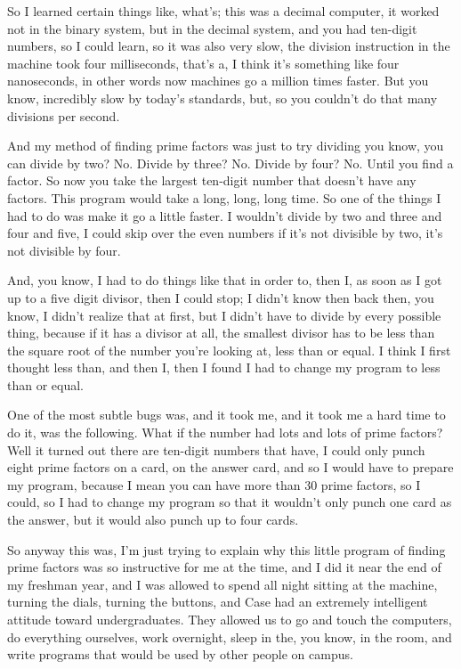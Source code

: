 \documentclass[]{article}
\begin{document}
So I learned certain things like, what's; this was a decimal computer,
it worked not in the binary system, but in the decimal system, and you
had ten-digit numbers, so I could learn, so it was also very slow, the
division instruction in the machine took four milliseconds, that's a, I
think it's something like four nanoseconds, in other words now machines
go a million times faster. But you know, incredibly slow by today's
standards, but, so you couldn't do that many divisions per second.

And my method of finding prime factors was just to try dividing you
know, you can divide by two? No. Divide by three? No. Divide by four?
No. Until you find a factor. So now you take the largest ten-digit
number that doesn't have any factors. This program would take a long,
long, long time. So one of the things I had to do was make it go a
little faster. I wouldn't divide by two and three and four and five, I
could skip over the even numbers if it's not divisible by two, it's not
divisible by four.

And, you know, I had to do things like that in order to, then I, as soon
as I got up to a five digit divisor, then I could stop; I didn't know
then back then, you know, I didn't realize that at first, but I didn't
have to divide by every possible thing, because if it has a divisor at
all, the smallest divisor has to be less than the square root of the
number you're looking at, less than or equal. I think I first thought
less than, and then I, then I found I had to change my program to less
than or equal.

One of the most subtle bugs was, and it took me, and it took me a hard
time to do it, was the following. What if the number had lots and lots
of prime factors? Well it turned out there are ten-digit numbers that
have, I could only punch eight prime factors on a card, on the answer
card, and so I would have to prepare my program, because I mean you can
have more than 30 prime factors, so I could, so I had to change my
program so that it wouldn't only punch one card as the answer, but it
would also punch up to four cards.

So anyway this was, I'm just trying to explain why this little program
of finding prime factors was so instructive for me at the time, and I
did it near the end of my freshman year, and I was allowed to spend all
night sitting at the machine, turning the dials, turning the buttons,
and Case had an extremely intelligent attitude toward undergraduates.
They allowed us to go and touch the computers, do everything ourselves,
work overnight, sleep in the, you know, in the room, and write programs
that would be used by other people on campus.
\end{document}
